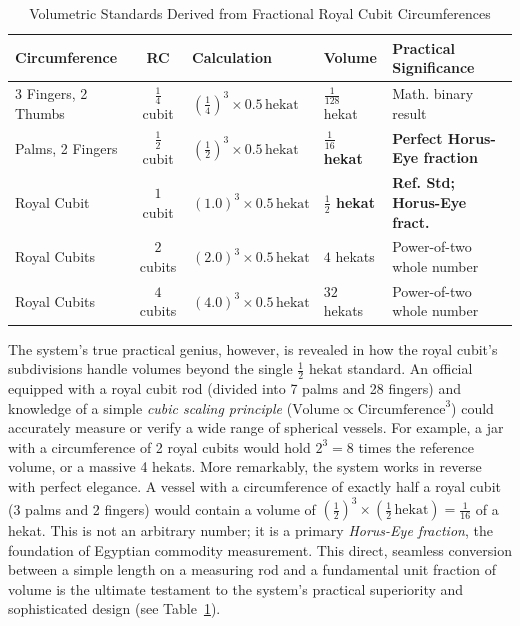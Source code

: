 \documentclass[11pt]{article}
\begin{document}
\begin{table}[htbp]
\centering
\caption{Volumetric Standards Derived from Fractional Royal Cubit Circumferences}
\label{tbl:volume_standards}
\begin{tabular}{l c l l l}
\toprule
\textbf{Circumference} & \textbf{RC} & \textbf{Calculation} & \textbf{Volume} & \textbf{Practical Significance} \\
\midrule
3 Fingers, 2 Thumbs & $\frac{1}{4}$ cubit & $(\frac{1}{4})^3 \times 0.5\,\text{hekat}$ & $\frac{1}{128}$ hekat & Math. binary result \\
\addlinespace %
3 Palms, 2 Fingers & $\frac{1}{2}$ cubit & $(\frac{1}{2})^3 \times 0.5\,\text{hekat}$ & \textbf{$\frac{1}{16}$ hekat} & \textbf{Perfect Horus-Eye fraction} \\
\addlinespace
1 Royal Cubit & $1$ cubit & $(1.0)^3 \times 0.5\,\text{hekat}$ & \textbf{$\frac{1}{2}$ hekat} & \textbf{Ref. Std; Horus-Eye fract.} \\
\addlinespace
2 Royal Cubits & $2$ cubits & $(2.0)^3 \times 0.5\,\text{hekat}$ & $4$ hekats & Power-of-two whole number\\
\addlinespace
4 Royal Cubits & $4$ cubits & $(4.0)^3 \times 0.5\,\text{hekat}$ & $32$ hekats & Power-of-two whole number\\
\bottomrule
\end{tabular}
\end{table}

The system's true practical genius, however, is revealed in how the royal cubit's subdivisions handle volumes beyond the single $\frac{1}{2}$ hekat standard. An official equipped with a royal cubit rod (divided into 7 palms and 28 fingers) and knowledge of a simple \textit{cubic scaling principle} ($\text{Volume} \propto \text{Circumference}^3$) could accurately measure or verify a wide range of spherical vessels. For example, a jar with a circumference of 2 royal cubits would hold $2^3 = 8$ times the reference volume, or a massive 4 hekats. More remarkably, the system works in reverse with perfect elegance. A vessel with a circumference of exactly half a royal cubit (3 palms and 2 fingers) would contain a volume of $(\frac{1}{2})^3 \times (\frac{1}{2}\,\text{hekat}) = \frac{1}{16}$ of a hekat. This is not an arbitrary number; it is a primary \textit{Horus-Eye fraction}, the foundation of Egyptian commodity measurement. This direct, seamless conversion between a simple length on a measuring rod and a fundamental unit fraction of volume is the ultimate testament to the system's practical superiority and sophisticated design (see Table~\ref{tbl:volume_standards}).
\end{document}
